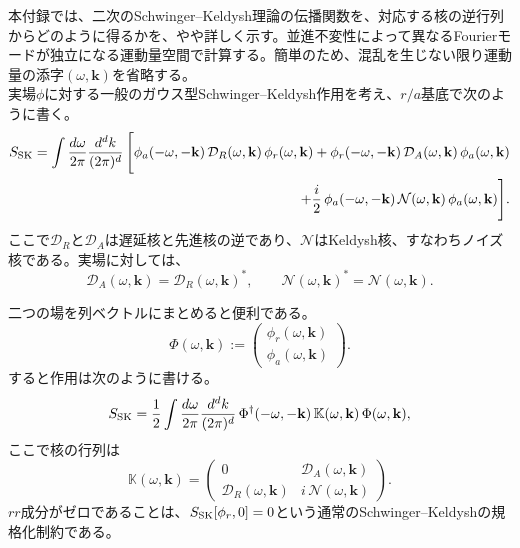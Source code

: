 \documentclass[a4paper,11pt,oneside]{article}
\theoremstyle{definition}
\numberwithin{equation}{section}
\begin{document}
本付録では、二次のSchwinger--Keldysh理論の伝播関数を、対応する核の逆行列からどのように得るかを、やや詳しく示す。並進不変性によって異なるFourierモードが独立になる運動量空間で計算する。簡単のため、混乱を生じない限り運動量の添字\((\omega,\mathbf k)\)を省略する。\\



実場\(\phi\)に対する一般のガウス型Schwinger--Keldysh作用を考え、\(r/a\)基底で次のように書く。
\begin{align}\label{AppQuadAction}
S_{\rm SK}
=
\int \frac{d\omega}{2\pi}\frac{d^d k}{(2\pi)^d}\,
\Bigg[
\phi_a(-\omega,-\mathbf k)\,\mathcal D_R(\omega,\mathbf k)\,\phi_r(\omega,\mathbf k)
+\phi_r(-\omega,-\mathbf k)\,\mathcal D_A(\omega,\mathbf k)\,\phi_a(\omega,\mathbf k)
\nonumber\\
\qquad\qquad
+\frac{i}{2}\,\phi_a(-\omega,-\mathbf k)\,\mathcal N(\omega,\mathbf k)\,\phi_a(\omega,\mathbf k)
\Bigg] .
\end{align}
ここで\(\mathcal D_R\)と\(\mathcal D_A\)は遅延核と先進核の逆であり、\(\mathcal N\)はKeldysh核、すなわちノイズ核である。実場に対しては、
\begin{equation}
\mathcal D_A(\omega,\mathbf k)=\mathcal D_R(\omega,\mathbf k)^* ,
\qquad
\mathcal N(\omega,\mathbf k)^*=\mathcal N(\omega,\mathbf k) .
\end{equation}


二つの場を列ベクトルにまとめると便利である。
\begin{equation}
\Phi(\omega,\mathbf k)
:=
\begin{pmatrix}
\phi_r(\omega,\mathbf k) \\[2mm]
\phi_a(\omega,\mathbf k)
\end{pmatrix} .
\end{equation}
すると作用は次のように書ける。
\begin{equation}\label{AppMatrixAction}
S_{\rm SK}
=
\frac12
\int \frac{d\omega}{2\pi}\frac{d^d k}{(2\pi)^d}\,
\Phi^\dagger(-\omega,-\mathbf k)\,
\mathbb K(\omega,\mathbf k)\,
\Phi(\omega,\mathbf k) ,
\end{equation}
ここで核の行列は
\begin{equation}\label{AppKmatrix}
\mathbb K(\omega,\mathbf k)
=
\begin{pmatrix}
0 & \mathcal D_A(\omega,\mathbf k) \\[2mm]
\mathcal D_R(\omega,\mathbf k) & i\,\mathcal N(\omega,\mathbf k)
\end{pmatrix} .
\end{equation}
\(rr\)成分がゼロであることは、$ S_{\rm SK}[\phi_{r},0]=0$という通常のSchwinger--Keldyshの規格化制約である。
\end{document}
